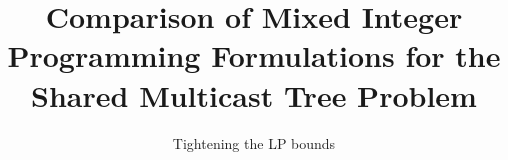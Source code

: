 



\makeatletter
\def\user@resume{resume}
\def\user@intermezzo{intermezzo}
%
\setcounter{savedparentequation}{1}
% 
\renewenvironment{subequations}[1][]{%
      \def\user@decides{#1}%
      \setcounter{previousequation}{\value{equation}}%
      \ifx\user@decides\user@resume 
           \setcounter{equation}{\value{savedparentequation}}%
      \else  
      \ifx\user@decides\user@intermezzo
           \refstepcounter{equation}%
      \else
           \setcounter{lastsubequation}{0}%
           \refstepcounter{equation}%
      \fi\fi
      \protected@edef\theHparentequation{%
          \@ifundefined {theHequation}\theequation \theHequation}%
      \protected@edef\theparentequation{\theequation}%
      \setcounter{parentequation}{\value{equation}}%
      \ifx\user@decides\user@resume 
           \setcounter{equation}{\value{lastsubequation}}%
         \else
           \setcounter{equation}{0}%
      \fi
      \def\theequation  {\theparentequation  \alph{equation}}%
      \def\theHequation {\theHparentequation \alph{equation}}%
      \ignorespaces
}{%
  \ifx\user@decides\user@resume
       \setcounter{lastsubequation}{\value{equation}}%
       \setcounter{equation}{\value{previousequation}}%
  \else
  \ifx\user@decides\user@intermezzo
       \setcounter{equation}{\value{parentequation}}%
  \else
       \setcounter{lastsubequation}{\value{equation}}%
       \setcounter{savedparentequation}{\value{parentequation}}%
       \setcounter{equation}{\value{parentequation}}%
  \fi\fi
  \ignorespacesafterend
}
\makeatother



\title{Comparison of Mixed Integer Programming Formulations for the Shared Multicast Tree Problem%
}
\subtitle{Tightening the LP bounds}

